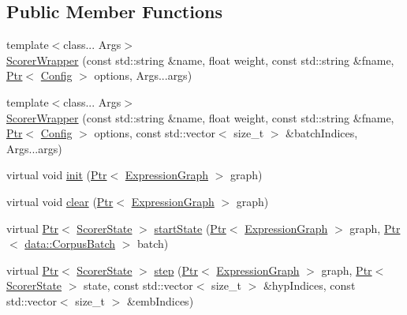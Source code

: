 \subsection*{Public Member Functions}
\begin{DoxyCompactItemize}
\item 
{\footnotesize template$<$class... Args$>$ }\\\hyperlink{classmarian_1_1ScorerWrapper_ab34eddb938c270883278d22326e4bece}{Scorer\+Wrapper} (const std\+::string \&name, float weight, const std\+::string \&fname, \hyperlink{namespacemarian_ad1a373be43a00ef9ce35666145137b08}{Ptr}$<$ \hyperlink{classmarian_1_1Config}{Config} $>$ options, Args...\+args)
\item 
{\footnotesize template$<$class... Args$>$ }\\\hyperlink{classmarian_1_1ScorerWrapper_a5acee4f1d49e12f72859523fa4f36355}{Scorer\+Wrapper} (const std\+::string \&name, float weight, const std\+::string \&fname, \hyperlink{namespacemarian_ad1a373be43a00ef9ce35666145137b08}{Ptr}$<$ \hyperlink{classmarian_1_1Config}{Config} $>$ options, const std\+::vector$<$ size\+\_\+t $>$ \&batch\+Indices, Args...\+args)
\item 
virtual void \hyperlink{classmarian_1_1ScorerWrapper_a60c96b84ad4453d1776a03471cf32ae2}{init} (\hyperlink{namespacemarian_ad1a373be43a00ef9ce35666145137b08}{Ptr}$<$ \hyperlink{classmarian_1_1ExpressionGraph}{Expression\+Graph} $>$ graph)
\item 
virtual void \hyperlink{classmarian_1_1ScorerWrapper_a74899e2039404d2cf249bd6c7a61bc13}{clear} (\hyperlink{namespacemarian_ad1a373be43a00ef9ce35666145137b08}{Ptr}$<$ \hyperlink{classmarian_1_1ExpressionGraph}{Expression\+Graph} $>$ graph)
\item 
virtual \hyperlink{namespacemarian_ad1a373be43a00ef9ce35666145137b08}{Ptr}$<$ \hyperlink{classmarian_1_1ScorerState}{Scorer\+State} $>$ \hyperlink{classmarian_1_1ScorerWrapper_a27b72b8c2c42265eb95b8e0600f11eb3}{start\+State} (\hyperlink{namespacemarian_ad1a373be43a00ef9ce35666145137b08}{Ptr}$<$ \hyperlink{classmarian_1_1ExpressionGraph}{Expression\+Graph} $>$ graph, \hyperlink{namespacemarian_ad1a373be43a00ef9ce35666145137b08}{Ptr}$<$ \hyperlink{classmarian_1_1data_1_1CorpusBatch}{data\+::\+Corpus\+Batch} $>$ batch)
\item 
virtual \hyperlink{namespacemarian_ad1a373be43a00ef9ce35666145137b08}{Ptr}$<$ \hyperlink{classmarian_1_1ScorerState}{Scorer\+State} $>$ \hyperlink{classmarian_1_1ScorerWrapper_aa3009ac5556282e55bf1d28ac474c0c7}{step} (\hyperlink{namespacemarian_ad1a373be43a00ef9ce35666145137b08}{Ptr}$<$ \hyperlink{classmarian_1_1ExpressionGraph}{Expression\+Graph} $>$ graph, \hyperlink{namespacemarian_ad1a373be43a00ef9ce35666145137b08}{Ptr}$<$ \hyperlink{classmarian_1_1ScorerState}{Scorer\+State} $>$ state, const std\+::vector$<$ size\+\_\+t $>$ \&hyp\+Indices, const std\+::vector$<$ size\+\_\+t $>$ \&emb\+Indices)
\end{DoxyCompactItemize}

